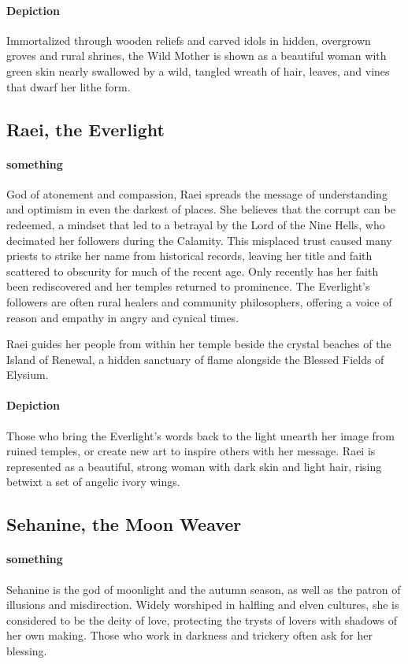 \documentclass[letterpaper,twocolumn,openany,nodeprecatedcode]{dndbook}
\begin{document}
\paragraph{Depiction}
Immortalized through wooden reliefs and carved idols in hidden, overgrown groves and rural
shrines, the Wild Mother is shown as a beautiful woman with green skin nearly swallowed by
a wild, tangled wreath of hair, leaves, and vines that dwarf her lithe form.

\subsection{Raei, the Everlight}

\paragraph{something}
God of atonement and compassion, Raei spreads the message of understanding and optimism in
even the darkest of places. She believes that the corrupt can be redeemed, a mindset that led
to a betrayal by the Lord of the Nine Hells, who decimated her followers during the Calamity.
This misplaced trust caused many priests to strike her name from historical records, leaving
her title and faith scattered to obscurity for much of the recent age. Only recently has her
faith been rediscovered and her temples returned to prominence. The Everlight’s followers are
often rural healers and community philosophers, offering a voice of reason and empathy in
angry and cynical times.

Raei guides her people from within her temple beside the crystal beaches of the Island of
Renewal, a hidden sanctuary of flame alongside the Blessed Fields of Elysium.

\paragraph{Depiction}
Those who bring the Everlight’s words back to the light unearth her image from ruined temples,
or create new art to inspire others with her message. Raei is represented as a beautiful,
strong woman with dark skin and light hair, rising betwixt a set of angelic ivory wings.

\subsection{Sehanine, the Moon Weaver}

\paragraph{something}
Sehanine is the god of moonlight and the autumn season, as well as the patron of illusions
and misdirection. Widely worshiped in halfling and elven cultures, she is considered to be
the deity of love, protecting the trysts of lovers with shadows of her own making. Those who
work in darkness and trickery often ask for her blessing.
\end{document}
